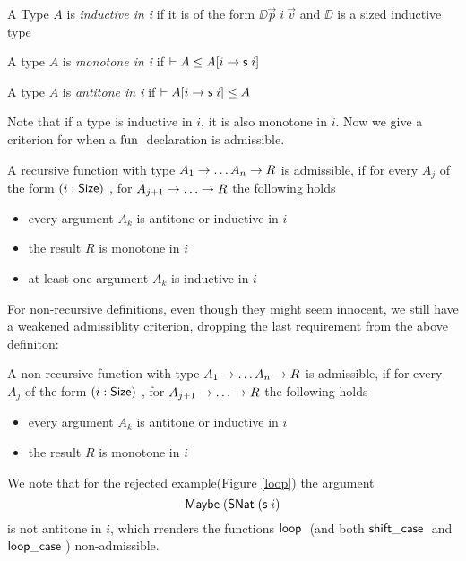 \begin{definition}
A Type $A$ is \emph{inductive in i} if it is of the form $ \DD \vec{p} \; i \: \vec{v} $ and $\DD$ is a sized inductive type
\end{definition}
\begin{definition}
A type $A$ is \emph{monotone in i} if $ \vdash A\leq A[i \rightarrow \mathsf{s}\; i ]$ 
\end{definition}
\begin{definition}
A type $A$ is \emph{antitone in i} if $ \vdash A[i \rightarrow \mathsf{s}\; i ]\leq A$ 
\end{definition}
Note that if a type is inductive in $i$, it is also monotone in $i$. 
Now we give a criterion for when a $\mathrm{fun}\;$ declaration is admissible.
\begin{definition}
A recursive function with type $ A_1 \rightarrow \dots A_n \rightarrow R $ is admissible, if
for every $A_j$ of the form $(i : \mathsf{Size} )$ , for $A_{j + 1} \ra \dots \ra R $ the following holds 
\begin{itemize}
\item
every argument $A_k$ is antitone or inductive in $i$
\item
the result $R$ is monotone in $i$  
\item
at least one argument $A_k$ is inductive in $i$
\end{itemize}
\end{definition}
For non-recursive definitions, even though they might seem innocent,
we still have a weakened admissiblity criterion, dropping the last requirement from the above definiton:
\begin{definition}
A non-recursive function with type $ A_1 \rightarrow \dots A_n \rightarrow R $ is admissible, if
for every $A_j$ of the form $(i : \mathsf{Size} )$ , for $A_{j + 1} \ra \dots \ra R $ the following holds 
\begin{itemize}
\item
every argument $A_k$ is antitone or inductive in $i$
\item
the result $R$ is monotone in $i$  
\end{itemize}
\end{definition}
We note that for the rejected example(Figure \ref{loop}) the argument \[\mathsf{Maybe}\; (\mathsf{SNat}\; (\mathsf{s}\; i)\] is not antitone in $i$, which rrenders the functions $\mathsf{loop}\;$ (and both $ \mathsf{shift\_case}\;$ and $\mathsf{loop\_case}\;$) non-admissible.
